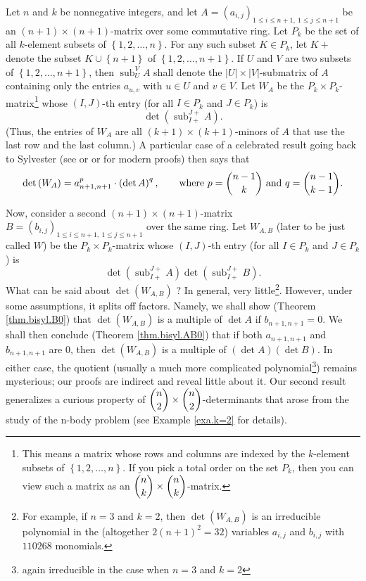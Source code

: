 \documentclass[numbers=enddot,12pt,final,onecolumn,notitlepage]{scrartcl}%
\theoremstyle{definition}
\begin{document}
Let $n$ and $k$ be nonnegative integers, and let $A=\left(  a_{i,j}\right)
_{1\leq i\leq n+1,\ 1\leq j\leq n+1}$ be an $\left(  n+1\right)  \times\left(
n+1\right)  $-matrix over some commutative ring. Let $P_{k}$ be the set of all
$k$-element subsets of $\left\{  1,2,\ldots,n\right\}  $. For any such subset
$K\in P_{k}$, let $K+$ denote the subset $K\cup\left\{  n+1\right\}  $ of
$\left\{  1,2,\ldots,n+1\right\}  $. If $U$ and $V$ are two subsets of
$\left\{  1,2,\ldots,n+1\right\}  $, then $\operatorname*{sub}\nolimits_{U}%
^{V}A$ shall denote the $\left\vert U\right\vert \times\left\vert V\right\vert
$-submatrix of $A$ containing only the entries $a_{u,v}$ with $u\in U$ and
$v\in V$. Let $W_{A}$ be the $P_{k}\times P_{k}$-matrix\footnote{This means a
matrix whose rows and columns are indexed by the $k$-element subsets of
$\left\{  1,2,\ldots,n\right\}  $. If you pick a total order on the set
$P_{k}$, then you can view such a matrix as an $\dbinom{n}{k}\times\dbinom
{n}{k}$-matrix.} whose $\left(  I,J\right)  $-th entry (for all $I\in P_{k}$
and $J\in P_{k}$) is
\[
\det\left(  \operatorname*{sub}\nolimits_{I+}^{J+}A\right)  .
\]
(Thus, the entries of $W_{A}$ are all $\left(  k+1\right)  \times\left(
k+1\right)  $-minors of $A$ that use the last row and the last column.) A
particular case of a celebrated result going back to Sylvester \cite{Sylves51}
(see \cite[\S 2.7]{Prasolov} or \cite[Teorema 2.9.1]{Prasol15} or
\cite{Mohr53} for modern proofs) then says that%
\[
\det\left(  W_{A}\right)  =a_{n+1,n+1}^{p}\cdot\left(  \det A\right)
^{q},\qquad\text{where }p=\dbinom{n-1}{k}\text{ and }q=\dbinom{n-1}{k-1}.
\]


Now, consider a second $\left(  n+1\right)  \times\left(  n+1\right)  $-matrix
$B=\left(  b_{i,j}\right)  _{1\leq i\leq n+1,\ 1\leq j\leq n+1}$ over the same
ring. Let $W_{A,B}$ (later to be just called $W$) be the $P_{k}\times P_{k}%
$-matrix whose $\left(  I,J\right)  $-th entry (for all $I\in P_{k}$ and $J\in
P_{k}$) is
\[
\det\left(  \operatorname*{sub}\nolimits_{I+}^{J+}A\right)  \det\left(
\operatorname*{sub}\nolimits_{I+}^{J+}B\right)  .
\]
What can be said about $\det\left(  W_{A,B}\right)  $ ? In general, very
little\footnote{For example, if $n=3$ and $k=2$, then $\det\left(
W_{A,B}\right)  $ is an irreducible polynomial in the (altogether $2\left(
n+1\right)  ^{2}=32$) variables $a_{i,j}$ and $b_{i,j}$ with $110268$
monomials.}. However, under some assumptions, it splits off factors. Namely,
we shall show (Theorem \ref{thm.bisyl.B0}) that $\det\left(  W_{A,B}\right)  $
is a multiple of $\det A$ if $b_{n+1,n+1}=0$. We shall then conclude (Theorem
\ref{thm.bisyl.AB0}) that if both $a_{n+1,n+1}$ and $b_{n+1,n+1}$ are $0$,
then $\det\left(  W_{A,B}\right)  $ is a multiple of $\left(  \det A\right)
\left(  \det B\right)  $. In either case, the quotient (usually a much more
complicated polynomial\footnote{again irreducible in the case when $n=3$ and
$k=2$}) remains mysterious; our proofs are indirect and reveal little about
it. Our second result generalizes a curious property of $\dbinom{n}{2}%
\times\dbinom{n}{2}$-determinants \cite[Theorem 10]{GriOlv18} that arose from
the study of the n-body problem (see Example \ref{exa.k=2} for details).
\end{document}
